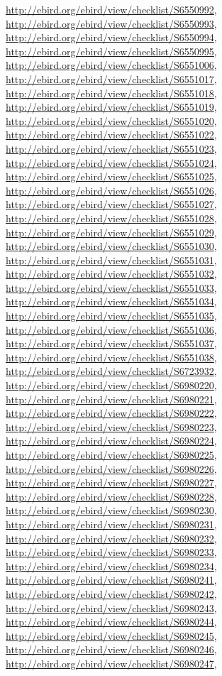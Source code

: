 \documentclass[9pt, article]{memoir}
\begin{document}
\begin{multicols}{2}
\url{http://ebird.org/ebird/view/checklist/S6550992}, 
\url{http://ebird.org/ebird/view/checklist/S6550993}, 
\url{http://ebird.org/ebird/view/checklist/S6550994}, 
\url{http://ebird.org/ebird/view/checklist/S6550995}, 
\url{http://ebird.org/ebird/view/checklist/S6551006}, 
\url{http://ebird.org/ebird/view/checklist/S6551017}, 
\url{http://ebird.org/ebird/view/checklist/S6551018}, 
\url{http://ebird.org/ebird/view/checklist/S6551019}, 
\url{http://ebird.org/ebird/view/checklist/S6551020}, 
\url{http://ebird.org/ebird/view/checklist/S6551022}, 
\url{http://ebird.org/ebird/view/checklist/S6551023}, 
\url{http://ebird.org/ebird/view/checklist/S6551024}, 
\url{http://ebird.org/ebird/view/checklist/S6551025}, 
\url{http://ebird.org/ebird/view/checklist/S6551026}, 
\url{http://ebird.org/ebird/view/checklist/S6551027}, 
\url{http://ebird.org/ebird/view/checklist/S6551028}, 
\url{http://ebird.org/ebird/view/checklist/S6551029}, 
\url{http://ebird.org/ebird/view/checklist/S6551030}, 
\url{http://ebird.org/ebird/view/checklist/S6551031}, 
\url{http://ebird.org/ebird/view/checklist/S6551032}, 
\url{http://ebird.org/ebird/view/checklist/S6551033}, 
\url{http://ebird.org/ebird/view/checklist/S6551034}, 
\url{http://ebird.org/ebird/view/checklist/S6551035}, 
\url{http://ebird.org/ebird/view/checklist/S6551036}, 
\url{http://ebird.org/ebird/view/checklist/S6551037}, 
\url{http://ebird.org/ebird/view/checklist/S6551038}, 
\url{http://ebird.org/ebird/view/checklist/S6723932}, 
\url{http://ebird.org/ebird/view/checklist/S6980220}, 
\url{http://ebird.org/ebird/view/checklist/S6980221}, 
\url{http://ebird.org/ebird/view/checklist/S6980222}, 
\url{http://ebird.org/ebird/view/checklist/S6980223}, 
\url{http://ebird.org/ebird/view/checklist/S6980224}, 
\url{http://ebird.org/ebird/view/checklist/S6980225}, 
\url{http://ebird.org/ebird/view/checklist/S6980226}, 
\url{http://ebird.org/ebird/view/checklist/S6980227}, 
\url{http://ebird.org/ebird/view/checklist/S6980228}, 
\url{http://ebird.org/ebird/view/checklist/S6980230}, 
\url{http://ebird.org/ebird/view/checklist/S6980231}, 
\url{http://ebird.org/ebird/view/checklist/S6980232}, 
\url{http://ebird.org/ebird/view/checklist/S6980233}, 
\url{http://ebird.org/ebird/view/checklist/S6980234}, 
\url{http://ebird.org/ebird/view/checklist/S6980241}, 
\url{http://ebird.org/ebird/view/checklist/S6980242}, 
\url{http://ebird.org/ebird/view/checklist/S6980243}, 
\url{http://ebird.org/ebird/view/checklist/S6980244}, 
\url{http://ebird.org/ebird/view/checklist/S6980245}, 
\url{http://ebird.org/ebird/view/checklist/S6980246}, 
\url{http://ebird.org/ebird/view/checklist/S6980247}, 

\end{multicols}
\end{document}
